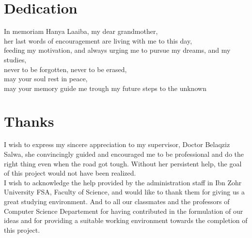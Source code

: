 
\chapter*{Dedication}
\thispagestyle{empty}
%
\begin{center}
  In memoriam Hanya Laaiba, my dear grandmother, ~ \\
  her last words of encouragement are living with me to this day, ~ \\
  feeding my motivation, and always urging me to pursue my dreams, and my studies, ~\\
  never to be forgotten, never to be erased, ~ \\
  may your soul rest in peace, ~ \\
  may your memory guide me trough my future steps to the unknown ~ \\


\end{center}
%
%
%
%
%
%
%
\cleardoublepage%
\chapter*{Thanks}
\thispagestyle{empty}
%
I wish to express my sincere appreciation to my supervisor, Doctor Belaqziz Salwa,
she convincingly guided and encouraged me to be
professional and do the right thing even when the road got tough. Without her
persistent help, the goal of this project would not have been realized.\\

I wish to acknowledge the help provided by the administration staff in
Ibn Zohr University \ac{FSA}, Faculty of Science, and would like to thank them for giving us a great studying
environment.
And to all our classmates and the professors of Computer Science Departement for having contributed
in the formulation of our ideas and for providing a suitable working environment towards the completion of
this project.  \\

